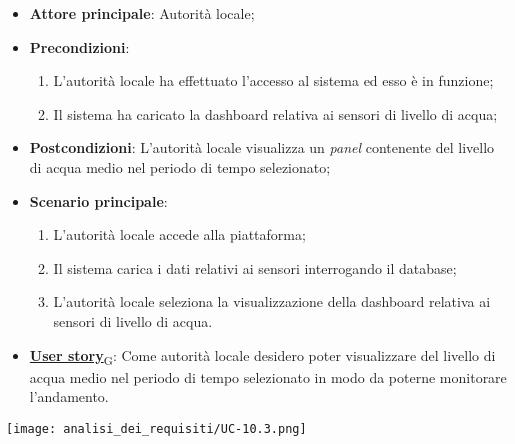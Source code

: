 \begin{itemize}
	\item \textbf{Attore principale}: Autorità locale;
	\item \textbf{Precondizioni}:
	      \begin{enumerate}
		      \item L'autorità locale ha effettuato l'accesso al sistema ed esso è in funzione;
		      \item Il sistema ha caricato la dashboard relativa ai sensori di livello di acqua;
	      \end{enumerate}
	\item \textbf{Postcondizioni}: L'autorità locale visualizza un \textit{panel} contenente del livello di acqua medio nel periodo di tempo selezionato;
	\item \textbf{Scenario principale}:
	      \begin{enumerate}
		      \item L'autorità locale accede alla piattaforma;
		      \item Il sistema carica i dati relativi ai sensori interrogando il database;
		      \item L'autorità locale seleziona la visualizzazione della dashboard relativa ai sensori di livello di acqua.
	      \end{enumerate}
	\item \href{https://7last.github.io/docs/rtb/documentazione-interna/glossario\#user-story}{\textbf{User story}\textsubscript{G}}:
	      Come autorità locale desidero poter visualizzare del livello di acqua medio nel periodo di tempo selezionato
	      in modo da poterne monitorare l'andamento.
\end{itemize}
\begin{center}
	\texttt{[image: analisi\_dei\_requisiti/UC-10.3.png]}
\end{center}

